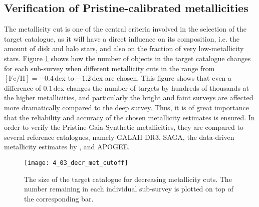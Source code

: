 \documentclass[a4paper,11pt]{article}
\begin{document}
\subsection{Verification of Pristine-calibrated metallicities}\label{metal_ver}
The metallicity cut is one of the central criteria involved in the selection of the target catalogue, as it will have a direct influence on its composition, i.e. the amount of disk and halo stars, and also on the fraction of very low-metallicity stars. Figure \ref{fig:decr_met_cutoff} shows how the number of objects in the target catalogue changes for each sub-survey when different metallicity cuts in the range from $\mathrm{[Fe/H]}=-0.4$\,dex to $-1.2$\,dex are chosen. This figure shows that even a difference of $0.1$\,dex changes the number of targets by hundreds of thousands at the higher metallicities, and particularly the bright and faint surveys are affected more dramatically compared to the deep survey. Thus, it is of great importance that the reliability and accuracy of the chosen metallicity estimates is ensured. In order to verify the Pristine-Gaia-Synthetic metallicities, they are compared to several reference catalogues, namely GALAH DR3, SAGA, the data-driven metallicity estimates by \citet{andrae23}, and APOGEE.
%
\begin{figure}
 \centering
 \texttt{[image: 4\_03\_decr\_met\_cutoff]}
 \caption[Target catalogue size for decreasing metallicity cuts]{The size of the target catalogue for decreasing metallicity cuts. The number remaining in each individual sub-survey is plotted on top of the corresponding bar.}
 \label{fig:decr_met_cutoff}
\end{figure}\\ \\
%
\end{document}
